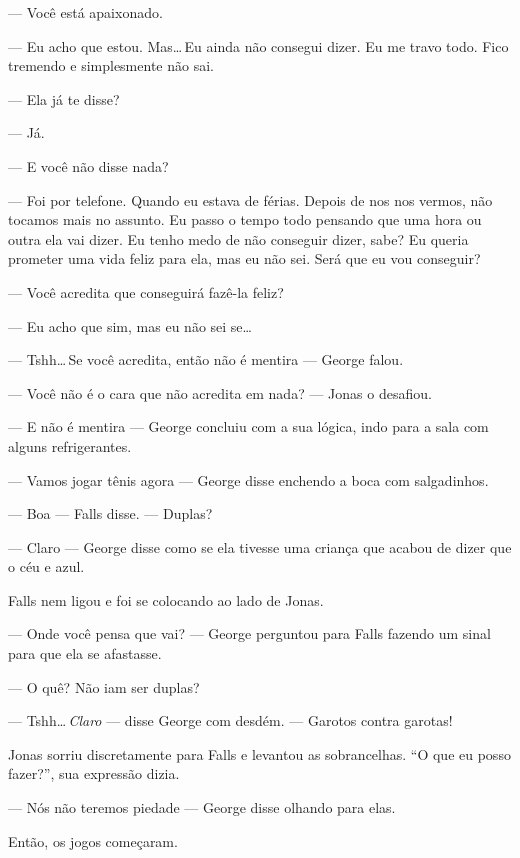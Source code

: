 --- Você está apaixonado.

--- Eu acho que estou. Mas\ldots\,Eu ainda não consegui dizer. Eu me travo todo. Fico tremendo e simplesmente não sai.

--- Ela já te disse?

--- Já.

--- E você não disse nada?

--- Foi por telefone. Quando eu estava de férias. Depois de nos nos vermos, não tocamos mais no assunto. Eu passo o tempo todo pensando que uma hora ou outra ela vai dizer. Eu tenho medo de não conseguir dizer, sabe? Eu queria prometer uma vida feliz para ela, mas eu não sei. Será que eu vou conseguir?

--- Você acredita que conseguirá fazê-la feliz?

--- Eu acho que sim, mas eu não sei se\ldots

--- Tshh\ldots\,Se você acredita, então não é mentira --- George falou.

--- Você não é o cara que não acredita em nada? --- Jonas o desafiou.

--- E não é mentira --- George concluiu com a sua lógica, indo para a sala com alguns refrigerantes.

--- Vamos jogar tênis agora --- George disse\mudanca{,} enchendo a boca com salgadinhos.

--- Boa --- Falls disse. --- Duplas?

--- Claro --- George disse\mudanca{,} como se ela tivesse uma criança que acabou de dizer que o céu e azul.

Falls nem ligou e foi se colocando ao lado de Jonas.

--- Onde você pensa que vai? --- George perguntou para Falls\mudanca{,} fazendo um sinal para que ela se afastasse.

--- O quê? Não iam ser duplas?

--- Tshh\ldots\,\emph{Claro} --- disse George com desdém. --- Garotos contra garotas!

Jonas sorriu discretamente para Falls e levantou as sobrancelhas. ``O que eu posso fazer?'', sua expressão dizia.

--- Nós não teremos piedade --- George disse olhando para elas.

Então, os jogos começaram.
